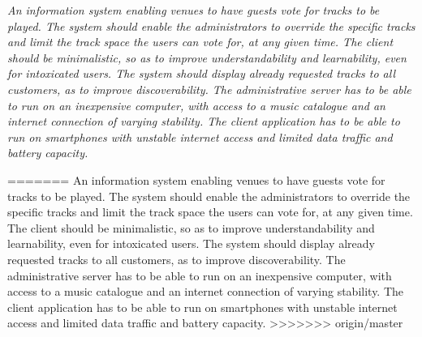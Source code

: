 \begin{center}
\textit{An information system enabling venues to have guests vote for tracks to be played. The system should enable the administrators to override the specific tracks and limit the track space the users can vote for, at any given time. The client should be minimalistic, so as to improve understandability and learnability, even for intoxicated users. The system should display already requested tracks to all customers, as to improve discoverability.
The administrative server has to be able to run on an inexpensive computer, with access to a music catalogue and an internet connection of varying stability. The client application has to be able to run on smartphones with unstable internet access and limited data traffic and battery capacity.}
\end{center}
=======
\label{sub:systemDefinition}
An information system enabling venues to have guests vote for tracks to be played. The system should enable the administrators to override the specific tracks and limit the track space the users can vote for, at any given time. The client should be minimalistic, so as to improve understandability and learnability, even for intoxicated users. The system should display already requested tracks to all customers, as to improve discoverability.
The administrative server has to be able to run on an inexpensive computer, with access to a music catalogue and an internet connection of varying stability. The client application has to be able to run on smartphones with unstable internet access and limited data traffic and battery capacity.
>>>>>>> origin/master
